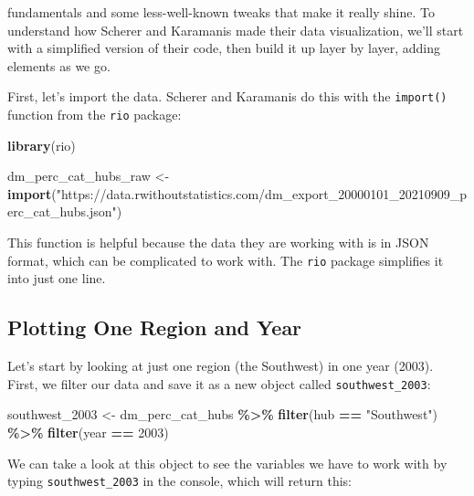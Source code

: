 \documentclass[
]{book}
\newenvironment{Shaded}{\begin{snugshade}}{\end{snugshade}}
\newcommand{\DecValTok}[1]{\textcolor[rgb]{0.00,0.00,0.81}{#1}}
\newcommand{\FunctionTok}[1]{\textcolor[rgb]{0.13,0.29,0.53}{\textbf{#1}}}
\newcommand{\NormalTok}[1]{#1}
\newcommand{\OtherTok}[1]{\textcolor[rgb]{0.56,0.35,0.01}{#1}}
\newcommand{\SpecialCharTok}[1]{\textcolor[rgb]{0.81,0.36,0.00}{\textbf{#1}}}
\newcommand{\StringTok}[1]{\textcolor[rgb]{0.31,0.60,0.02}{#1}}
\begin{document}
fundamentals and some less-well-known tweaks that make it really shine. To understand how Scherer and Karamanis made their data visualization, we'll start with a simplified version of their code, then build it up layer by layer, adding elements as we go.

First, let's import the data. Scherer and Karamanis do this with the \texttt{import()} function from the \texttt{rio} package:

\begin{Shaded}
\begin{Highlighting}[]
\FunctionTok{library}\NormalTok{(rio)}

\NormalTok{dm\_perc\_cat\_hubs\_raw }\OtherTok{\textless{}{-}} \FunctionTok{import}\NormalTok{(}\StringTok{"https://data.rwithoutstatistics.com/dm\_export\_20000101\_20210909\_perc\_cat\_hubs.json"}\NormalTok{)}
\end{Highlighting}
\end{Shaded}

This function is helpful because the data they are working with is in JSON format, which can be complicated to work with. The \texttt{rio} package simplifies it into just one line.

\hypertarget{plotting-one-region-and-year}{%
\subsection*{Plotting One Region and Year}\label{plotting-one-region-and-year}}

Let's start by looking at just one region (the Southwest) in one year (2003). First, we filter our data and save it as a new object called \texttt{southwest\_2003}:

\begin{Shaded}
\begin{Highlighting}[]
\NormalTok{southwest\_2003 }\OtherTok{\textless{}{-}}\NormalTok{ dm\_perc\_cat\_hubs }\SpecialCharTok{\%\textgreater{}\%}
  \FunctionTok{filter}\NormalTok{(hub }\SpecialCharTok{==} \StringTok{"Southwest"}\NormalTok{) }\SpecialCharTok{\%\textgreater{}\%}
  \FunctionTok{filter}\NormalTok{(year }\SpecialCharTok{==} \DecValTok{2003}\NormalTok{)}
\end{Highlighting}
\end{Shaded}

We can take a look at this object to see the variables we have to work with by typing \texttt{southwest\_2003} in the console, which will return this:
\end{document}
